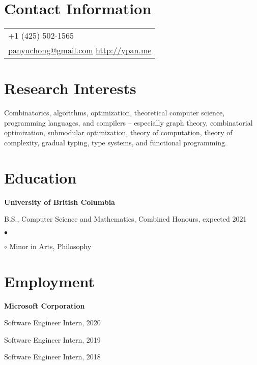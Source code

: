 \documentclass[margin,line]{res}
\newenvironment{list1}{
  \begin{list}{\ding{113}}{%
      \setlength{\itemsep}{0in}
      \setlength{\parsep}{0.025in} \setlength{\parskip}{0in}
      \setlength{\topsep}{0in} \setlength{\partopsep}{0in}
      \setlength{\leftmargin}{0.17in}}}{\end{list}}
\newenvironment{list2}{
  \begin{list}{$\bullet$}{%
      \setlength{\itemsep}{0in}
      \setlength{\parsep}{0in} \setlength{\parskip}{0in}
      \setlength{\topsep}{0in} \setlength{\partopsep}{0in}
      \setlength{\leftmargin}{0.2in}}}{\end{list}}
\begin{document}

\begin{resume}

\section{\sc Contact Information}

\vspace{.05in}
\begin{tabular}{p{2in}}
+1 (425) 502-1565 \\
\href{mailto:panyuchong@gmail.com}{panyuchong@gmail.com}
\href{http://ypan.me/}{http://ypan.me}
\end{tabular}


\section{\sc Research Interests}
Combinatorics, algorithms, optimization, theoretical computer science, programming languages, and compilers -- especially graph theory, combinatorial optimization, submodular optimization, theory of computation, theory of complexity, gradual typing, type systems, and functional programming.

\section{\sc Education}

{\bf University of British Columbia}\\
\vspace*{-.1in}
\begin{list1}
\item[] B.S., Computer Science and Mathematics, Combined Honours, expected 2021
  \begin{list2}
  \item[$\circ$] Minor in Arts, Philosophy
  \end{list2}
\end{list1}


\section{\sc Employment}

{\bf Microsoft Corporation}\\
\vspace*{-.1in}
\begin{list1}
\item[] Software Engineer Intern, 2020
\item[] Software Engineer Intern, 2019
\item[] Software Engineer Intern, 2018
\end{list1}


\end{resume}
\end{document}

